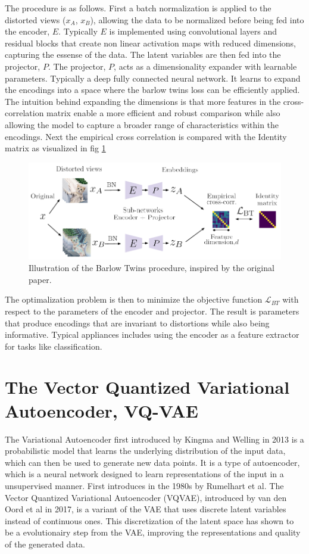 The procedure is as follows. First a batch normalization is applied to the distorted views ($x_A$, $x_B$), allowing the data to be normalized before being fed into the encoder, $E$.
Typically $E$ is implemented using convolutional layers and residual blocks that create non linear activation maps with reduced dimensions, capturing the essense of the data. The latent variables are then fed into the projector, $P$.
The projector, $P$, acts as a dimensionality expander with learnable parameters. Typically a deep fully connected neural network. It learns to expand the encodings into a space where the barlow twins loss can be efficiently applied.
The intuition behind expanding the dimensions is that more features in the cross-correlation matrix enable a more efficient and robust comparison while also allowing the model to capture a broader range of characteristics within the encodings.
Next the empirical cross correlation is compared with the Identity matrix as visualized in fig \ref{fig:Barlow}

\begin{figure}[H]
    \includegraphics[scale=0.8]{figures/figure-pdf/BarlowT.pdf}
    \caption{Illustration of the Barlow Twins procedure, inspired by the original paper\cite{Barlow}.}
    \label{fig:Barlow}
\end{figure}

The optimalization problem is then to minimize the objective function $\mathcal{L}_{BT}$ with respect to the parameters of the encoder and projector. The result is parameters that produce encodings that are invariant to distortions while also being informative.
Typical appliances includes using the encoder as a feature extractor for tasks like classification.

\section{The Vector Quantized Variational Autoencoder, VQ-VAE}
The Variational Autoencoder first introduced by Kingma and Welling in 2013\cite{VAE} is a probabilistic model that learns the underlying distribution of the input data, which can then be used to generate new data points. It is a type of autoencoder, which is a neural network designed to learn
representations of the input in a unsupervised manner. First introduces in the 1980s by Rumelhart et al\cite{Rumelhart}. The Vector Quantized Variational Autoencoder (VQVAE), introduced by van den Oord et al\cite{neuvqvae} in 2017, is a variant of the VAE that uses discrete latent variables instead of continuous ones.
This discretization of the latent space has shown to be a evolutionairy step from the VAE, improving the representations and quality of the generated data.

